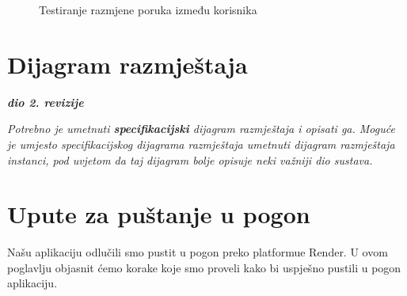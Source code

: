 			 \begin{figure}
			 	\centering
			 	\caption{Testiranje razmjene poruka između korisnika}
			 	\label{fig:Testiranje razmjene poruka između korisnika}
			 \end{figure}
			 
		
		\newpage
		
		\section{Dijagram razmještaja}
			
			\textbf{\textit{dio 2. revizije}}
			
			 \textit{Potrebno je umetnuti \textbf{specifikacijski} dijagram razmještaja i opisati ga. Moguće je umjesto specifikacijskog dijagrama razmještaja umetnuti dijagram razmještaja instanci, pod uvjetom da taj dijagram bolje opisuje neki važniji dio sustava.}
			
			\eject 
		
		\section{Upute za puštanje u pogon}
		\indent Našu aplikaciju odlučili smo pustit u pogon preko platformue Render. U ovom poglavlju objasnit ćemo korake koje smo proveli kako bi uspješno pustili u pogon aplikaciju.\newline
	
